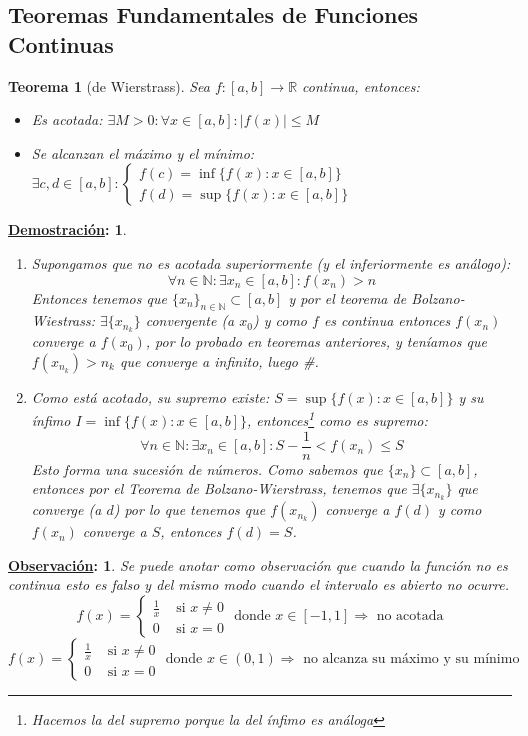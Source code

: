 \documentclass[10pt,a4paper,openright]{book}
\theoremstyle{break}
\newtheorem*{theo}{Teorema}
\newtheorem*{demo}{\underline{Demostración}:}
\newtheorem*{obs}{\underline{Observación}:}
\begin{document}
\subsection{Teoremas Fundamentales de Funciones Continuas}
\begin{theo}[de Wierstrass]
Sea $f:[a,b] \rightarrow \mathbb R$ continua, entonces:
\begin{itemize}
\item Es acotada: $\exists M>0: \forall x\in [a,b]: |f(x)|\leq M$

\item Se alcanzan el máximo y el mínimo: $\exists c,d\in [a,b]: \begin{cases} f(c)=\inf\{f(x): x\in [a,b]\} \\ f(d)=\sup\{f(x): x\in [a,b]\}\end{cases}$
\end{itemize}
\end{theo}
\begin{demo}
\begin{enumerate}
\item Supongamos que no es acotada superiormente (y el inferiormente es análogo):
$$\forall n\in \mathbb N: \exists x_n\in [a,b]: f(x_n)>n$$
Entonces tenemos que $\{x_n\}_{n\in \mathbb N}\subset [a,b]$ y por el teorema de Bolzano-Wiestrass: $\exists \{x_{n_k}\}$ convergente (a $x_0$) y como $f$ es continua entonces $f(x_n)$ converge a $f(x_0)$, por lo probado en teoremas anteriores, y teníamos que $f(x_{n_k})>n_k$ que converge a infinito, luego \#.

\item Como está acotado, su supremo existe: $S=\sup\{f(x): x\in [a,b]\}$ y su ínfimo $I=\inf\{f(x): x\in [a,b]\}$, entonces\footnote{Hacemos la del supremo porque la del ínfimo es análoga} como es supremo:
$$\forall n\in \mathbb N: \exists x_n\in [a,b]: S-\frac{1}{n}<f(x_n)\leq S$$
Esto forma una sucesión de números. Como sabemos que $\{x_n\}\subset[a,b]$, entonces por el Teorema de Bolzano-Wierstrass, tenemos que $\exists \{x_{n_k}\}$ que converge (a $d$) por lo que tenemos que $f(x_{n_k})$ converge a $f(d)$ y como $f(x_n)$ converge a $S$, entonces $f(d)=S$.
\end{enumerate}
\end{demo}

\begin{obs}
Se puede anotar como observación que cuando la función no es continua esto es falso y del mismo modo cuando el intervalo es abierto no ocurre.
$$f(x)=\begin{cases} \frac{1}{x} & \mbox{ si }x\neq 0 \\ 0 &\mbox{ si }x=0\end{cases} \mbox{ donde }x\in [-1,1]\Rightarrow \mbox{ no acotada}$$
$$f(x)=\begin{cases} \frac{1}{x} & \mbox{ si }x\neq 0 \\ 0 &\mbox{ si }x=0\end{cases} \mbox{ donde }x\in (0,1)\Rightarrow \mbox{ no alcanza su máximo y su mínimo}$$
\end{obs}
\end{document}
